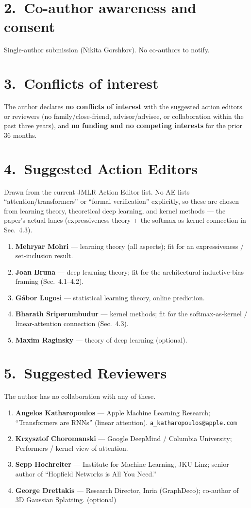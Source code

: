 \documentclass[11pt]{article}
\begin{document}
\section*{2.~Co-author awareness and consent}
Single-author submission (Nikita Gorshkov). No co-authors to notify.

\section*{3.~Conflicts of interest}
The author declares \textbf{no conflicts of interest} with the suggested action
editors or reviewers (no family/close-friend, advisor/advisee, or collaboration
within the past three years), and \textbf{no funding and no competing interests}
for the prior 36 months.

\section*{4.~Suggested Action Editors}
Drawn from the current JMLR Action Editor list. No AE lists
``attention/transformers'' or ``formal verification'' explicitly, so these are
chosen from learning theory, theoretical deep learning, and kernel methods --- the
paper's actual lanes (expressiveness theory + the softmax-as-kernel connection in
Sec.~4.3).
\begin{enumerate}[leftmargin=1.6em]
  \item \textbf{Mehryar Mohri} --- learning theory (all aspects); fit for an
    expressiveness / set-inclusion result.
  \item \textbf{Joan Bruna} --- deep learning theory; fit for the
    architectural-inductive-bias framing (Sec.~4.1--4.2).
  \item \textbf{G\'abor Lugosi} --- statistical learning theory, online prediction.
  \item \textbf{Bharath Sriperumbudur} --- kernel methods; fit for the
    softmax-as-kernel / linear-attention connection (Sec.~4.3).
  \item \textbf{Maxim Raginsky} --- theory of deep learning (optional).
\end{enumerate}

\section*{5.~Suggested Reviewers}
The author has no collaboration with any of these.
\begin{enumerate}[leftmargin=1.6em]
  \item \textbf{Angelos Katharopoulos} --- Apple Machine Learning Research;
    ``Transformers are RNNs'' (linear attention). \texttt{a\_katharopoulos@apple.com}
  \item \textbf{Krzysztof Choromanski} --- Google DeepMind / Columbia University;
    Performers / kernel view of attention.
  \item \textbf{Sepp Hochreiter} --- Institute for Machine Learning, JKU Linz;
    senior author of ``Hopfield Networks is All You Need.''
  \item \textbf{George Drettakis} --- Research Director, Inria (GraphDeco);
    co-author of 3D Gaussian Splatting. (optional)
\end{enumerate}
\end{document}
